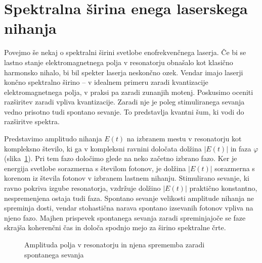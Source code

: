 \section{Spektralna širina enega laserskega nihanja}
Povejmo še nekaj o spektralni širini svetlobe enofrekvenčnega laserja. 
Če bi se lastno stanje 
elektromagnetnega polja v resonatorju obnašalo kot klasično 
harmonsko nihalo, bi bil spekter laserja neskončno ozek. Vendar 
imajo laserji končno spektralno širino -- v idealnem primeru zaradi
kvantizacije elektromagnetnega polja, v praksi pa zaradi zunanjih motenj.
Poskusimo oceniti razširitev zaradi vpliva kvantizacije. Zaradi nje
je poleg stimuliranega sevanja vedno prisotno tudi spontano sevanje. To 
predstavlja kvantni šum, ki vodi do razširitve spektra. 

Predstavimo amplitudo nihanja $E(t)$ na izbranem mestu v resonatorju kot kompleksno 
število, ki ga v kompleksni ravnini določata dolžina $|E(t)|$ in faza
$\varphi$ (slika~\ref{fig:fazor}). 
Pri tem fazo določimo glede na neko začetno izbrano fazo. 
Ker je energija svetlobe sorazmerna s številom fotonov, je dolžina $|E(t)|$
sorazmerna s korenom iz števila fotonov v izbranem lastnem nihanju. 
Stimulirano sevanje, ki ravno pokriva izgube resonatorja, vzdržuje
dolžino $|E(t)|$ praktično konstantno, nespremenjena ostaja 
tudi faza. Spontano sevanje velikosti amplitude nihanja ne spreminja dosti, 
vendar stohastična narava spontano izsevanih fotonov vpliva na njeno fazo.
Majhen prispevek spontanega sevanja zaradi spreminjajoče se faze
skrajša koherenčni čas in določa spodnjo mejo za širino spektralne črte. 

\begin{figure}[h]
\centering
\def\svgwidth{70truemm} 

\caption{Amplituda polja v resonatorju in njena sprememba zaradi 
spontanega sevanja}
\label{fig:fazor}
\end{figure}

